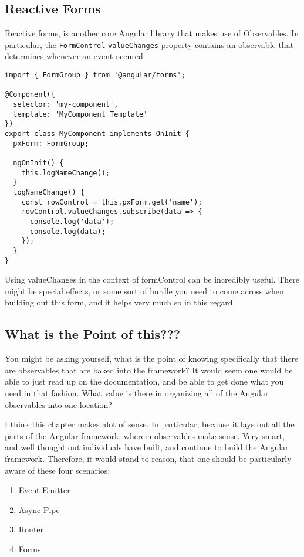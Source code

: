 \subsection{ Reactive Forms }
Reactive forms, is another core Angular library that makes use of Observables. 
In particular, the \lstinline{FormControl} \lstinline{valueChanges} property 
contains an observable that determines whenever an event occured. 
\begin{lstlisting}
import { FormGroup } from '@angular/forms';

@Component({
  selector: 'my-component',
  template: 'MyComponent Template'
})
export class MyComponent implements OnInit {
  pxForm: FormGroup;

  ngOnInit() {
    this.logNameChange();
  }
  logNameChange() {
    const rowControl = this.pxForm.get('name');
    rowControl.valueChanges.subscribe(data => {
      console.log('data');
      console.log(data);
    });
  }
}  
\end{lstlisting}

Using valueChanges in the context of formControl can be incredibly useful. 
There might be special effects, or some sort of hurdle you need to come 
across when building out this form, and it helps very much so in this 
regard. 


\subsection{What is the Point of this??? }
You might be asking yourself, what is the point of knowing specifically that 
there are observables that are baked into the framework? It would seem one 
would be able to just read up on the documentation, and be able to get done 
what you need in that fashion. What value is there in organizing all of the 
Angular observables into one location? 

I think this chapter makes alot of sense. In particular, because it lays out
all the parts of the Angular framework, wherein observables make sense. Very 
smart, and well thought out individuals have built, and continue to build the 
Angular framework. Therefore, it would stand to reason, that one should be 
particularly aware of these four scenarios: 
\begin{enumerate}
  \item Event Emitter
  \item Async Pipe
  \item Router
  \item Forms
\end{enumerate}

